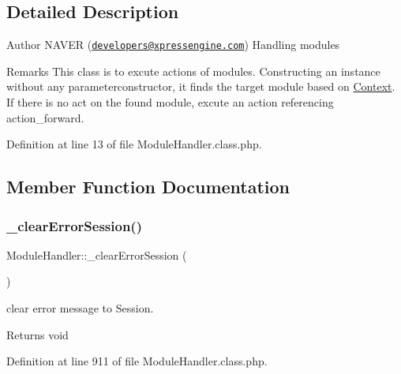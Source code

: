 \subsection{Detailed Description}
\begin{DoxyAuthor}{Author}
N\+A\+V\+ER (\href{mailto:developers@xpressengine.com}{\tt developers@xpressengine.\+com}) Handling modules
\end{DoxyAuthor}
\begin{DoxyRemark}{Remarks}
This class is to excute actions of modules. Constructing an instance without any parameterconstructor, it finds the target module based on \hyperlink{classContext}{Context}. If there is no act on the found module, excute an action referencing action\+\_\+forward. 
\end{DoxyRemark}


Definition at line 13 of file Module\+Handler.\+class.\+php.



\subsection{Member Function Documentation}
\hypertarget{classModuleHandler_a45c91a72acccf3ee8139538ef5aa1c1d}{}\label{classModuleHandler_a45c91a72acccf3ee8139538ef5aa1c1d} 
\subsubsection{\texorpdfstring{\+\_\+clear\+Error\+Session()}{\_clearErrorSession()}}
{\footnotesize\ttfamily Module\+Handler\+::\+\_\+clear\+Error\+Session (\begin{DoxyParamCaption}{ }\end{DoxyParamCaption})}

clear error message to Session. \begin{DoxyReturn}{Returns}
void 
\end{DoxyReturn}


Definition at line 911 of file Module\+Handler.\+class.\+php.

\hypertarget{classModuleHandler_a75e1eb90149d7f6e38cfd5dc7a9521d4}{}\label{classModuleHandler_a75e1eb90149d7f6e38cfd5dc7a9521d4} 
